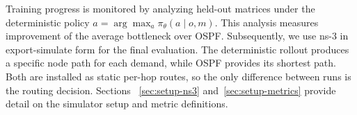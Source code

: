 Training progress is monitored by analyzing held-out matrices under the deterministic policy $a = \arg\max_a \pi_\theta(a\mid o,m)$. This analysis measures improvement of the average bottleneck over OSPF. Subsequently, we use ns-3 in export-simulate form for the final evaluation. The deterministic rollout produces a specific node path for each demand, while OSPF provides its shortest path. Both are installed as static per-hop routes, so the only difference between runs is the routing decision. Sections ~\ref{sec:setup-ns3} and~\ref{sec:setup-metrics} provide detail on the simulator setup and metric definitions.
